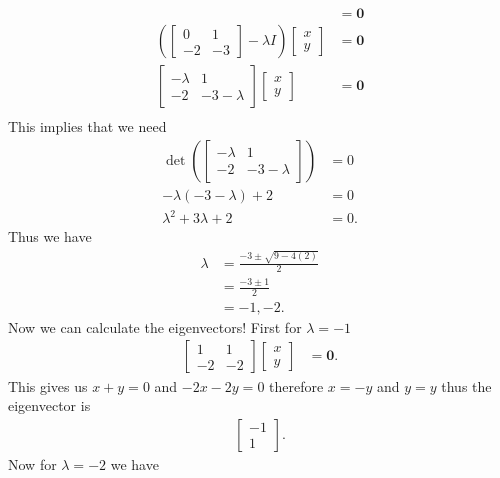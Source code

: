 \documentclass[10pt]{amsart}
\theoremstyle{nonumberplain}
\begin{document}
\begin{enumerate}[label={\bf {\arabic*}:}]
\begin{enumerate}
\begin{align*}
	&= \bm { 0 } \\
\left( \begin{bmatrix} 0 & 1 \\ -2 & -3 \end{bmatrix}
 - \lambda I \right)\begin{bmatrix} x \\ y \end{bmatrix}
	&= \bm { 0 } \\
\begin{bmatrix} -\lambda & 1 \\ -2 & -3 - \lambda \end{bmatrix}
\begin{bmatrix} x \\ y \end{bmatrix}
	&= \bm { 0 } \\
\end{align*}
This implies that we need
\begin{align*}
\det{ \left( \begin{bmatrix} -\lambda & 1 \\ -2 & -3 - \lambda \end{bmatrix} \right)} &= 0 \\
-\lambda(-3 -\lambda) + 2 &= 0 \\
\lambda^2 + 3\lambda + 2 &= 0.
\end{align*}
Thus we have
\begin{align*}
\lambda &= \frac{-3 \pm \sqrt{9 - 4(2)}} 2 \\
	&= \frac{-3 \pm 1} 2 \\
	&= -1, -2.
\end{align*}
Now we can calculate the eigenvectors!
First for $\lambda = -1$
\begin{align*}
\begin{bmatrix} 1 & 1 \\ -2 & -2 \end{bmatrix}
\begin{bmatrix} x \\ y \end{bmatrix}
	&= \bm { 0 }.
\end{align*}
This gives us $x + y = 0$ and $-2x -2y = 0$ therefore $x = -y$ and $y = y$ thus the eigenvector is
\begin{align*}
\begin{bmatrix} -1 \\ 1 \end{bmatrix}.
\end{align*}
Now for $\lambda = -2$ we have

\end{enumerate}
\end{enumerate}
\end{document}
